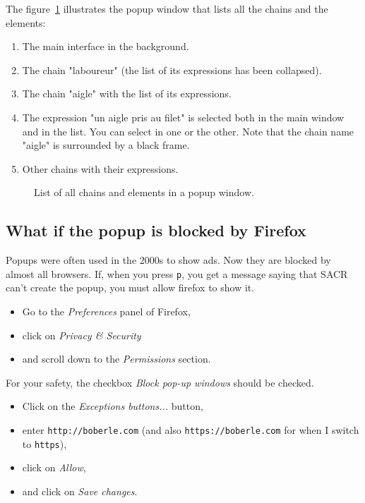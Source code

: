 \documentclass[12pt]{article}
\begin{document}
The figure~\ref{fig:popup-at-a-glance} illustrates the popup window that lists
all the chains and the elements:
\begin{enumerate}
   \item The main interface in the background.
   \item The chain "laboureur" (the list of its expressions has been
   collapsed).
   \item The chain "aigle" with the list of its expressions.
   \item The expression "un aigle pris au filet" is selected both in the main
   window and in the list.  You can select in one or the other.  Note that the
   chain name "aigle" is surrounded by a black frame.
   \item Other chains with their expressions.
\end{enumerate}

\begin{figure}
\begin{center}
{%
\setlength{\fboxsep}{0pt}%
}
\end{center}
\caption{List of all chains and elements in a popup window.}
\label{fig:popup-at-a-glance}
\end{figure}

 \subsection{What if the popup is blocked by Firefox}

Popups were often used in the 2000s to show ads.  Now they are blocked by
almost all browsers.  If, when you press \verb|p|, you get a message saying
that SACR can't create the popup, you must allow firefox to show it.

\begin{itemize}
   \item Go to the \emph{Preferences} panel of Firefox,
   \item click on \emph{Privacy \& Security}
   \item and scroll down to the \emph{Permissions} section.
\end{itemize}

For your safety, the checkbox \emph{Block pop-up windows} should be checked.

\begin{itemize}
   \item Click on the \emph{Exceptions buttons...} button,
   \item enter \verb|http://boberle.com| (and also \verb|https://boberle.com|
   for when I switch to \verb|https|),
   \item click on \emph{Allow},
   \item and click on \emph{Save changes}.
\end{itemize}
\end{document}
